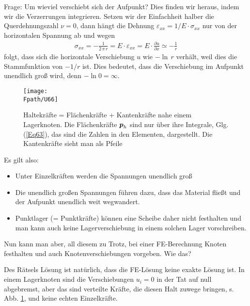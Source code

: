 Frage: Um wieviel verschiebt sich der Aufpunkt? Dies finden wir heraus, indem wir die Verzerrungen integrieren. Setzen wir der Einfachheit halber die Querdehnungszahl $\nu = 0$, dann h\"{a}ngt die Dehnung $\varepsilon_{xx} = 1/E\cdot\sigma_{xx}$ nur von der horizontalen Spannung ab und wegen
\begin{align}
\sigma_{xx} =  -\frac{1}{2\,\pi\,r} =  E \cdot \varepsilon_{xx} =  E \cdot \frac{\partial u}{\partial x} \simeq -\frac{1}{r}
\end{align}
folgt, dass sich die horizontale Verschiebung $u $ wie $- \ln\,r$ verh\"{a}lt, weil dies die Stammfunktion von $-1/r$ ist. Dies bedeutet, dass die Verschiebung im Aufpunkt unendlich gro{\ss} wird, denn $-\ln 0 = \infty$.
\begin{figure}
\centering
\if {} \sidecaption[t] \fi
{\texttt{[image: \\Fpath/U66]}}
\caption{Haltekr\"{a}fte = Fl\"{a}chenkr\"{a}fte + Kantenkr\"{a}fte nahe einem Lagerknoten. Die Fl\"{a}chenkr\"{a}fte $\mbox{\boldmath $p$}_h$ sind nur \"{u}ber ihre Integrale, Glg. (\ref{Eq63}), das sind die Zahlen in den Elementen, dargestellt. Die Kantenkr\"{a}fte sieht man als Pfeile}
\label{U66}%
\end{figure}%

Es gilt also:
\begin{itemize}
  \item Unter Einzelkr\"{a}ften werden die Spannungen unendlich gro{\ss}
  \item Die unendlich gro{\ss}en Spannungen f\"{u}hren dazu, dass das Material flie{\ss}t und der Aufpunkt unendlich weit wegwandert.
  \item Punktlager (= Punktkr\"{a}fte) k\"{o}nnen eine Scheibe daher nicht festhalten und man kann auch keine Lagerverschiebung in einem solchen Lager vorschreiben.
 \end{itemize}

Nun kann man aber, all diesem zu Trotz, bei einer FE-Berechnung Knoten festhalten und auch Knotenverschiebungen vorgeben. Wie das?

Des R\"{a}tsels L\"{o}sung ist nat\"{u}rlich, dass die FE-L\"{o}sung keine exakte L\"{o}sung ist. In einem Lagerknoten sind die Verschiebungen $u_i = 0$ in der Tat auf null abgebremst, aber das sind verteilte Kr\"{a}fte, die diesen Halt zuwege bringen, s. Abb. \ref{U66}, und keine echten Einzelkr\"{a}fte.

